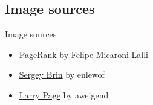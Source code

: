 \subsection{Image sources}
\begin{frame}{Image sources}
    \begin{itemize}
	\item \href{https://commons.wikimedia.org/wiki/File:PageRank-hi-res.png}{PageRank} by Felipe Micaroni Lalli
        \item \href{http://commons.wikimedia.org/wiki/File:Sergey_Brin.JPG}{Sergey Brin} by enlewof
        \item \href{http://commons.wikimedia.org/wiki/File:Larry_Page_laughs.jpg}{Larry Page} by aweigend
    \end{itemize}
\end{frame}

